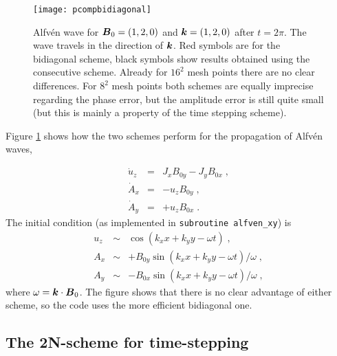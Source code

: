 \documentclass[\mydriver,12pt,twoside,notitlepage,a4paper]{article}
\renewcommand{\vec}[1]{\mbox{\boldmath{$#1$}}}
\newcommand{\Bv}            {\vec{B}}
\newcommand{\kv}            {\vec{k}}
\begin{document}
\begin{figure}[h]
  \centering
  \texttt{[image: pcompbidiagonal]}
  \caption{
    Alfv\'en wave for $\Bv_0=(1,2,0)$ and $\kv=(1,2,0)$ after $t=2\pi$.
    The wave travels in the direction of $\kv$.
    Red symbols are for the bidiagonal scheme, black symbols show results
    obtained using the consecutive scheme.
    Already for $16^2$ mesh points there are no clear differences.
    For $8^2$ mesh points both schemes are equally imprecise regarding
    the phase error, but the amplitude error is still quite small
    (but this is mainly a property of the time stepping scheme).
  }
  \label{Fig-pcompbidiagonal}
\end{figure}

Figure \ref{Fig-pcompbidiagonal} shows how the two schemes perform for the
propagation of Alfv\'en waves,

\begin{eqnarray}
  \dot{u}_z &=& J_xB_{0y}-J_yB_{0x} \; , \\
  \dot{A}_x &=& -u_zB_{0y} \; , \\
  \dot{A}_y &=& +u_zB_{0x} \; .
\end{eqnarray}
The initial condition (as implemented in \texttt{subroutine alfven\_xy})
is
\begin{eqnarray}
  u_z &\sim& \cos(k_xx+k_yy-\omega t) \; , \\
  A_x &\sim& +B_{0y}\sin(k_xx+k_yy-\omega t)/\omega \; , \\
  A_y &\sim& -B_{0x}\sin(k_xx+k_yy-\omega t)/\omega \; ,
\end{eqnarray}
where $\omega=\kv\cdot\Bv_0$.
The figure shows that there is no clear advantage of either scheme, so the
code uses the more efficient bidiagonal one.

\subsection{The 2N-scheme for time-stepping}
\label{S-2N-scheme}
\end{document}
